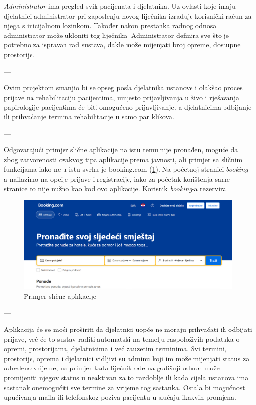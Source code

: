 		\textit{Administrator} ima pregled svih pacijenata i djelatnika. Uz ovlasti koje imaju djelatnici administrator pri zaposlenju novog liječnika izrađuje korisnički račun za njega s inicijalnom lozinkom. Također nakon prestanka radnog odnosa administrator može ukloniti tog liječnika. Administrator definira sve što je potrebno za ispravan rad sustava, dakle može mijenjati broj opreme, dostupne prostorije.
		
		---
		
		Ovim projektom smanjio bi se opseg posla djelatnika ustanove i olakšao proces prijave na rehabilitaciju pacijentima, umjesto prijavljivanja u živo i rješavanja papirologije pacijentima će biti omogućeno prijavljivanje, a djelatnicima odbijanje ili prihvaćanje termina rehabilitacije u samo par klikova. 
		
		---
		
		Odgovarajući primjer slične aplikacije na istu temu nije pronađen, moguće da zbog zatvorenosti ovakvog tipa aplikacije prema javnosti, ali primjer sa sličnim funkcijama iako ne u istu svrhu je booking.com (\ref{fig:booking}). Na početnoj stranici \textit{booking}-a nailazimo na opcije prijave i registracije, iako za početak korištenja same stranice to nije nužno kao kod ovo aplikacije. Korisnik \textit{booking}-a rezervira 
		
		\begin{figure}[H]
			\includegraphics[scale=0.4]{slike/slicna_aplikacija.PNG} %
			\centering
			\caption{Primjer slične aplikacije}
			\label{fig:booking}
		\end{figure}
		
		---
		
		Aplikacija će se moći proširiti da djelatnici uopće ne moraju prihvaćati ili odbijati prijave, već će to sustav raditi automatski na temelju raspoloživih podataka o opremi, prostorijama, djelatnicima i već zauzetim terminima. Svi termini, prostorije, oprema i djelatnici vidljivi su adminu koji im može mijenjati status za određeno vrijeme, na primjer kada liječnik ode na godišnji odmor može promijeniti njegov status u neaktivan za to razdoblje ili kada cijela ustanova ima sastanak onemogućiti sve termine za vrijeme tog sastanka. Ostala bi mogućnost upućivanja maila ili telefonskog poziva pacijentu u slučaju ikakvih promjena. 
		
